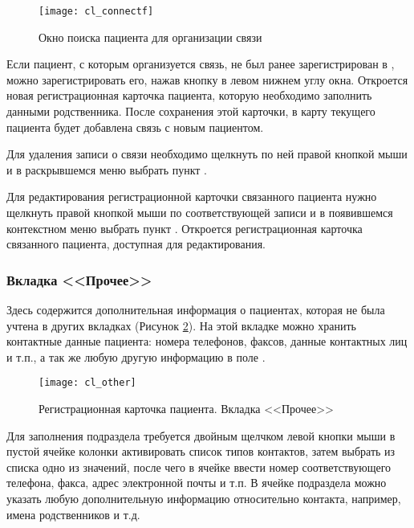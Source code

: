 \begin{figure}[ht!]\centering
 \texttt{[image: cl\_connectf]}
 \caption{Окно поиска пациента для организации связи}
 \label{img_cl_connectf}
\end{figure} 

Если пациент, с которым организуется связь, не был ранее зарегистрирован в \tmis, можно зарегистрировать его, нажав кнопку  в левом нижнем углу окна. Откроется новая регистрационная карточка пациента, которую необходимо заполнить данными родственника. После сохранения этой карточки, в карту текущего пациента будет добавлена связь с новым пациентом.

Для удаления записи о связи необходимо щелкнуть по ней правой кнопкой мыши и в раскрывшемся меню выбрать пункт .

Для редактирования регистрационной карточки связанного пациента нужно щелкнуть правой кнопкой мыши по соответствующей записи и в появившемся контекстном меню выбрать пункт . Откроется регистрационная карточка связанного пациента, доступная для редактирования.

\subsubsection{Вкладка <<Прочее>>}

Здесь содержится дополнительная информация о пациентах, которая не была учтена в других вкладках (Рисунок \ref{img_cl_other}). На этой вкладке можно хранить контактные данные пациента: номера телефонов, факсов, данные контактных лиц и т.п., а так же любую другую информацию в поле .

\begin{figure}[ht]\centering
 \texttt{[image: cl\_other]}
 \caption{Регистрационная карточка пациента. Вкладка <<Прочее>>}
 \label{img_cl_other}
\end{figure} 

Для заполнения подраздела  требуется двойным щелчком левой кнопки мыши в пустой ячейке колонки  активировать список типов контактов, затем выбрать из списка одно из значений, после чего в ячейке  ввести номер соответствующего телефона, факса, адрес электронной почты и т.п. В ячейке  подраздела  можно указать любую дополнительную информацию относительно контакта, например, имена родственников и т.д.


